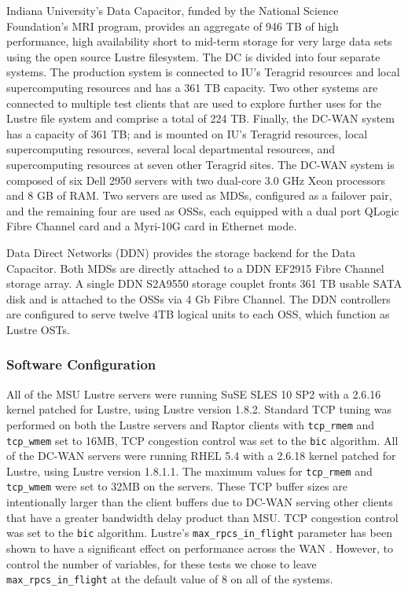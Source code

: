 \documentclass[]{sig-alternate}
\begin{document}
Indiana University's Data Capacitor, funded by the National
Science Foundation's MRI program, provides an aggregate of 946 TB of high
performance, high availability short to mid-term storage for very
large data sets using the open source Lustre filesystem. The DC is divided into four separate systems. The production system is connected to IU's Teragrid resources and local supercomputing resources and has a 361 TB capacity. Two other systems are connected to multiple test clients that are used to explore further uses for the Lustre file system and comprise a total of 224 TB. Finally, the DC-WAN system has a capacity of 361 TB; and is mounted on IU's Teragrid resources, local supercomputing resources, several local departmental resources, and supercomputing resources at seven other Teragrid sites. The DC-WAN system is composed of six Dell 2950 servers with two dual-core 3.0 GHz Xeon processors and 8 GB of RAM.
Two servers are used as MDSs, configured as a failover pair, and the remaining four are used as
OSSs, each equipped with a dual port QLogic Fibre Channel card and a
Myri-10G card in Ethernet mode. 

Data Direct Networks (DDN) provides the storage backend for the
Data Capacitor. Both MDSs are directly attached to a
DDN EF2915 Fibre Channel storage array. A single DDN S2A9550 storage
couplet fronts 361 TB usable SATA disk and is attached to the OSSs via 4 Gb Fibre Channel. The DDN controllers are configured to serve twelve 4TB logical units to each OSS, which
function as Lustre OSTs.

\subsubsection{Software Configuration}
All of the MSU Lustre servers were running SuSE SLES 10 SP2 with a 2.6.16 kernel patched for Lustre, using Lustre version 1.8.2. Standard TCP tuning was performed on both the Lustre servers and Raptor clients with {\tt tcp\_rmem} and {\tt tcp\_wmem} set to 16MB, TCP congestion control was set to the {\tt bic} algorithm.
All of the DC-WAN servers were running RHEL 5.4 with a 2.6.18 kernel patched for Lustre, using Lustre version 1.8.1.1. The maximum values for {\tt tcp\_rmem} and {\tt tcp\_wmem} were set to 32MB on the servers. These TCP buffer sizes are intentionally larger than the client buffers due to DC-WAN serving other clients that have a greater bandwidth delay product than MSU. TCP congestion control was set to the {\tt bic} algorithm.  Lustre's {\tt max\_rpcs\_in\_flight} parameter has been shown to have a significant
effect on performance across the WAN \cite{simms2007}. However, to control the number of variables, for these tests we chose to leave {\tt max\_rpcs\_in\_flight} at the default value of 8 on all of the systems.
\end{document}
